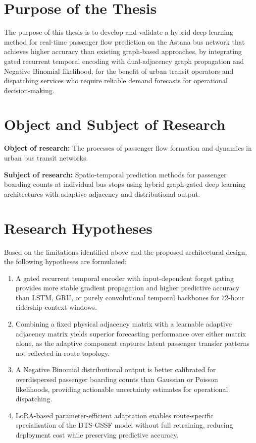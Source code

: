 \section{Purpose of the Thesis}
\label{sec:purpose}

The purpose of this thesis is to develop and validate a hybrid deep learning method for real-time passenger flow prediction on the Astana bus network that achieves higher accuracy than existing graph-based approaches, by integrating gated recurrent temporal encoding with dual-adjacency graph propagation and Negative Binomial likelihood, for the benefit of urban transit operators and dispatching services who require reliable demand forecasts for operational decision-making.

\section{Object and Subject of Research}
\label{sec:object_subject}

\textbf{Object of research:} The processes of passenger flow formation and dynamics in urban bus transit networks.

\textbf{Subject of research:} Spatio-temporal prediction methods for passenger boarding counts at individual bus stops using hybrid graph-gated deep learning architectures with adaptive adjacency and distributional output.

\section{Research Hypotheses}
\label{sec:hypotheses}

Based on the limitations identified above and the proposed architectural design, the following hypotheses are formulated:

\begin{enumerate}
    \item[\textbf{H1:}] A gated recurrent temporal encoder with input-dependent forget gating provides more stable gradient propagation and higher predictive accuracy than LSTM, GRU, or purely convolutional temporal backbones for 72-hour ridership context windows.
    \item[\textbf{H2:}] Combining a fixed physical adjacency matrix with a learnable adaptive adjacency matrix yields superior forecasting performance over either matrix alone, as the adaptive component captures latent passenger transfer patterns not reflected in route topology.
    \item[\textbf{H3:}] A Negative Binomial distributional output is better calibrated for overdispersed passenger boarding counts than Gaussian or Poisson likelihoods, providing actionable uncertainty estimates for operational dispatching.
    \item[\textbf{H4:}] LoRA-based parameter-efficient adaptation enables route-specific specialisation of the DTS-GSSF model without full retraining, reducing deployment cost while preserving predictive accuracy.
\end{enumerate}

